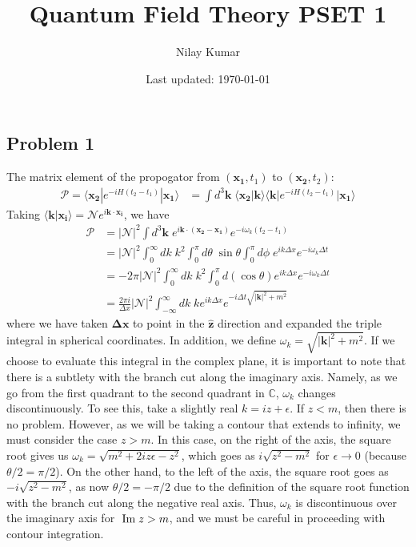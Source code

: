 \documentclass{mathnotes}
\title{Quantum Field Theory PSET 1}
\author{Nilay Kumar}
\date{Last updated: \today}
\begin{document}
\maketitle

\subsection*{Problem 1}

The matrix element of the propogator from $(\mathbf{x_1}, t_1)$ to $(\mathbf{x_2}, t_2)$:
\begin{align*}
    \mathcal{P}=\langle \mathbf{x_2} | e^{-i H (t_2-t_1)} | \mathbf{x_1} \rangle &=\int d^3\mathbf{k}\; \langle \mathbf{x_2} | \mathbf{k} \rangle
    \langle \mathbf{k} | e^{-iH(t_2-t_1)} | \mathbf{x_1} \rangle
\end{align*}
Taking $\langle \mathbf{k} | \mathbf{x_i}\rangle=\mathcal{N}e^{i\mathbf{k}\cdot\mathbf{x_i}}$, we have
\begin{align*}
    \mathcal{P}&=|\mathcal{N}|^2 \int d^3\mathbf{k}\; e^{i\mathbf{k}\cdot (\mathbf{x_2}-\mathbf{x_1})} e^{-i\omega_k(t_2-t_1)}\\
    &=|\mathcal{N}|^2\int_0^\infty dk\; k^2\int_0^{\pi} d\theta\; \sin\theta \int_0^\pi d\phi\; e^{ik\Delta x}e^{-i\omega_k\Delta t}\\
    &=-2\pi|\mathcal{N}|^2\int_0^\infty dk\;k^2\int_0^\pi d(\cos\theta) e^{ik\Delta x}e^{-i\omega_k\Delta t} \\ 
    &=\frac{2\pi i}{\Delta x}|\mathcal{N}|^2\int_{-\infty}^\infty dk\; ke^{ik\Delta x}e^{-i\Delta t\sqrt{|\mathbf{k}|^2+m^2}}
\end{align*}
where we have taken $\mathbf{\Delta x}$ to point in the $\hat{\mathbf{z}}$ direction and expanded the triple integral in spherical coordinates. In addition, we define
$\omega_k=\sqrt{|\mathbf{k}|^2+m^2}$. If we choose to evaluate this integral in the complex plane, it is important to note that there is a subtlety with the branch cut along the imaginary
axis. Namely, as we go from the first quadrant to the second quadrant in $\mathbb{C}$, $\omega_k$ changes discontinuously. To see this, take a slightly real $k=iz+\epsilon$.
If $z<m$, then there is no problem. However, as we will be taking a contour that extends to infinity, we must consider the case $z>m$. In this case,
on the right of the axis, the square root gives us $\omega_k=\sqrt{m^2+2iz\epsilon-z^2}$, which goes as $i\sqrt{z^2-m^2}$ for $\epsilon\to 0$ (because $\theta/2=\pi/2$).
On the other hand, to the left of the axis, the square root goes as $-i\sqrt{z^2-m^2}$, as now $\theta/2=-\pi/2$ due to the definition of the square root function with the
branch cut along the negative real axis. Thus, $\omega_k$ is discontinuous over the imaginary axis for $\;\textnormal{Im}\;z>m$, and we must be careful in proceeding with contour integration.
\end{document}
